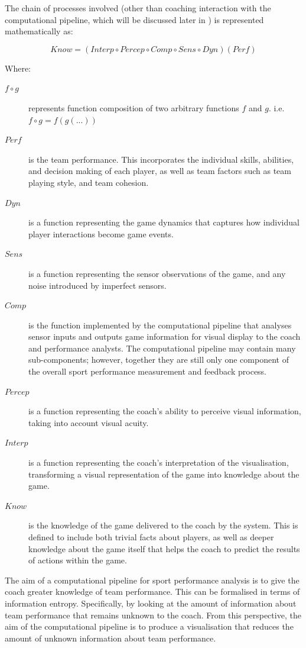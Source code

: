 \begin{minipage}{1.0\textwidth}
The chain of processes involved (other than coaching interaction with the computational pipeline, which will be discussed later in ) is represented mathematically as:

\[Know = (Interp \circ Percep \circ Comp \circ Sens \circ Dyn) (Perf)\]


Where:
\begin{description}
    \item[$f \circ g$] represents function composition of two arbitrary functions $f$ and $g$. i.e. $f \circ g = f(g(...))$
    \item[$Perf$] is the team performance. This incorporates the individual skills, abilities, and decision making of each player, as well as team factors such as team playing style, and team cohesion.
    \item[$Dyn$] is a function representing the game dynamics that captures how individual player interactions become game events.
    \item[$Sens$] is a function representing the sensor observations of the game, and any noise introduced by imperfect sensors.
    \item[$Comp$] is the function implemented by the computational pipeline that analyses sensor inputs and outputs game information for visual display to the coach and performance analysts. The computational pipeline may contain many sub-components; however, together they are still only one component of the overall sport performance measurement and feedback process.
    \item[$Percep$] is a function representing the coach's ability to perceive visual information, taking into account visual acuity.
    \item[$Interp$] is a function representing the coach's interpretation of the visualisation, transforming a visual representation of the game into knowledge about the game.
    \item[$Know$] is the knowledge of the game delivered to the coach by the system. This is defined to include both trivial facts about players, as well as deeper knowledge about the game itself that helps the coach to predict the results of actions within the game.
\end{description}
\end{minipage}

\vspace{1em}

The aim of a computational pipeline for sport performance analysis is to give the coach greater knowledge of team performance. This can be formalised in terms of information entropy. Specifically, by looking at the amount of information about team performance that remains unknown to the coach. From this perspective, the aim of the computational pipeline is to produce a visualisation that reduces the amount of unknown information about team performance.

